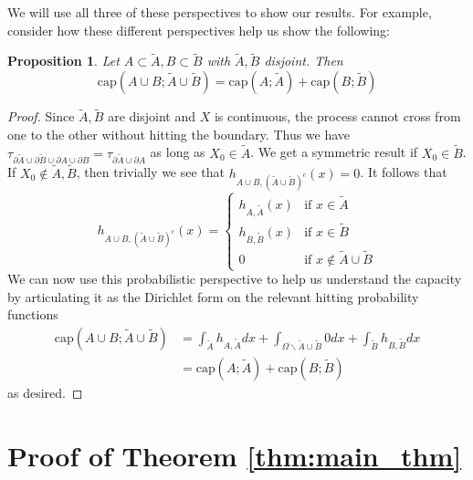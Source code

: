 \documentclass[english, aip, jcp, priprint, graphicx,floatfix]{revtex4-1}
\newtheorem{proposition}{Proposition}
\theoremstyle{plain}
\theoremstyle{definition}
\theoremstyle{plain}
\newcommand{\capac}[2]{\mathrm{cap}\left(#1;#2\right)}
\begin{document}
  We will use all three of these perspectives to show our results.  For example, consider how these different perspectives help us show the following:

\begin{proposition}\label{prop:capacity}
Let $A\subset \tilde A,B\subset \tilde B$ with $\tilde A,\tilde B$ disjoint.  Then 
\[
\capac{A\cup B}{\tilde A \cup \tilde B}=\capac{A}{\tilde A}+\capac{B}{\tilde B}
\]
\end{proposition}
\begin{proof}
Since $\tilde A,\tilde B$ are disjoint and $X$ is continuous, the process cannot cross from one to the other without hitting the boundary.  Thus we have $\tau_{\partial \tilde A\cup \partial \tilde B \cup \partial A \cup \partial B}=\tau_{\partial \tilde A \cup \partial A}$ as long as $X_0\in\tilde A$.  We get a symmetric result if $X_0\in \tilde B$.  If $X_0\notin \tilde A,\tilde B$, then trivially we see that $h_{A\cup B,(\tilde A \cup \tilde B)^c}(x)=0$.  It follows that
\[
h_{A\cup B,(\tilde A\cup\tilde B)^c}(x) = 
    \begin{cases}
    h_{A,\tilde A}(x) & \mbox{if }x\in \tilde A\\
    h_{B,\tilde B}(x) & \mbox{if }x\in \tilde B\\
    0 & \mbox{if }x\notin \tilde A\cup\tilde B
    \end{cases}
\]
We can now use this probabilistic perspective to help us understand the capacity by articulating it as the Dirichlet form on the relevant hitting probability functions
\begin{align*}
\capac{A\cup B}{\tilde A \cup \tilde B} &= 
        \int_{\tilde A} h_{A,\tilde A}dx
        +\int_{\Omega\backslash \tilde A \cup \tilde B} 0 dx  
        +\int_{\tilde B} h_{B,\tilde B}dx \\
        &= \capac{A}{\tilde A}+\capac{B}{\tilde B}
\end{align*}
as desired.
\end{proof}


                                                       


\section{Proof of Theorem \ref{thm:main_thm}}\label{sec:proof_thm}
\end{document}
